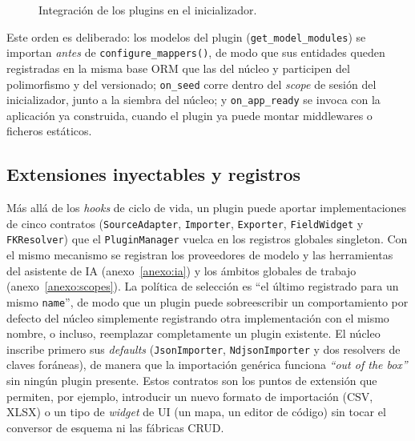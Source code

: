 \begin{figure}[H]
\caption{Integración de los plugins en el inicializador.}
\label{fig:plugin-lifecycle}
\end{figure}

Este orden es deliberado: los modelos del plugin
(\texttt{get\_model\_modules}) se importan \emph{antes} de
\texttt{configure\_mappers()}, de modo que sus entidades queden registradas en
la misma base ORM que las del núcleo y participen del polimorfismo y del
versionado; \texttt{on\_seed} corre dentro del \emph{scope} de sesión del
inicializador, junto a la siembra del núcleo; y \texttt{on\_app\_ready} se
invoca con la aplicación ya construida, cuando el plugin ya puede montar
middlewares o ficheros estáticos.

\subsection{Extensiones inyectables y registros}
Más allá de los \emph{hooks} de ciclo de vida, un plugin puede aportar
implementaciones de cinco contratos (\texttt{SourceAdapter}, \texttt{Importer},
\texttt{Exporter}, \texttt{FieldWidget} y \texttt{FKResolver}) que el
\texttt{PluginManager} vuelca en los registros globales singleton. Con el
mismo mecanismo se registran los proveedores de modelo y las herramientas del
asistente de IA (anexo~\ref{anexo:ia}) y los ámbitos globales de trabajo
(anexo~\ref{anexo:scopes}).
La política de selección es ``el último registrado para un mismo \texttt{name}'', 
de modo que un plugin puede sobreescribir un comportamiento por defecto
del núcleo simplemente registrando otra implementación con el mismo nombre, o incluso,
reemplazar completamente un plugin existente. El
núcleo inscribe primero sus \emph{defaults} (\texttt{JsonImporter},
\texttt{NdjsonImporter} y dos resolvers de claves foráneas), de manera que la
importación genérica funciona \emph{``out of the box''} sin ningún plugin presente.
Estos contratos son los puntos de extensión que permiten, por ejemplo,
introducir un nuevo formato de importación (CSV, XLSX) o un tipo de \emph{widget}
de UI (un mapa, un editor de código) sin tocar el conversor de esquema ni las
fábricas CRUD.

